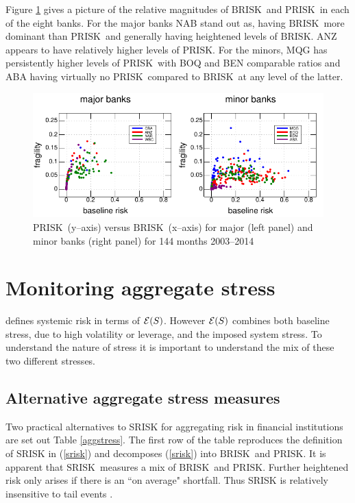 \documentclass[authoryear]{elsarticle}
\newcommand{\Ex}{{\cal E}}
\newcommand{\Es}{\Ex}
\newcommand{\sr}{\ensuremath{\mathrm{SRISK}}}
\newcommand{\br}{\ensuremath{\mathrm{BRISK}}}
\newcommand{\pr}{\ensuremath{\mathrm{PRISK}}}
\newcommand{\eref}[1]{(\ref{#1})}
\newcommand{\fref}[1]{Figure \ref{#1}}
\newcommand{\tref}[1]{Table \ref{#1}}
\begin{document}
\fref{sysstress} gives a picture of the relative magnitudes of \br\ and \pr\ in each of the eight banks.   For the major banks NAB stand out as, having \br\ more dominant than \pr\ and generally having heightened levels of \br.   ANZ appears to have relatively higher levels of \pr.    For the minors, MQG has persistently higher levels of \pr\ with BOQ and BEN comparable ratios and ABA having virtually no \pr\ compared to \br\ at any level of the latter. 

\begin{figure}[htbp]
\begin{center}
\includegraphics[width=12cm]{figures/sysstress.pdf}
\caption{\pr\  (y--axis) versus \br\  (x--axis)   for major  (left panel) and  minor banks (right panel)  for 144 months 2003--2014}
\label{sysstress}
\end{center}
\end{figure}


\section{Monitoring aggregate  stress}\label{aggregate}

\cite{brownlees2015} defines systemic risk in terms of $\Es(S)$. However $\Es(S)$ combines both baseline stress, due to high volatility or leverage, and the imposed system stress. To understand the nature of stress it is important to understand the mix of these two different stresses.

\subsection{Alternative aggregate stress measures}  

Two practical alternatives to SRISK for aggregating risk in financial institutions are set out \tref{aggstress}.  
The first row of the table reproduces the definition of SRISK in \eref{srisk} and decomposes \eref{srisk} into \br\ and \pr.  It is apparent that \sr\  measures a mix of \br\ and \pr.   Further heightened risk only arises if there is an ``on average"  shortfall.   Thus SRISK is relatively insensitive to tail events .
\end{document}
